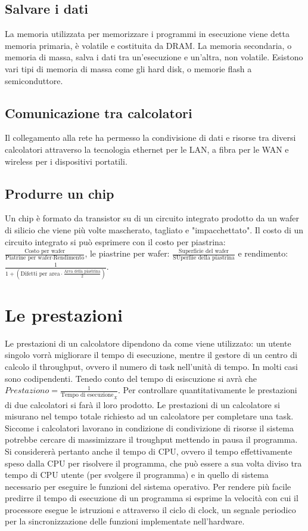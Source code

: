 \subsection{Salvare i dati}
La memoria utilizzata per memorizzare i programmi in esecuzione viene detta memoria primaria, \`e volatile e costituita da DRAM. La memoria secondaria, o memoria di massa, 
salva i dati tra un'esecuzione e un'altra, non volatile. Esistono vari tipi di memoria di massa come gli hard disk, o memorie flash a semiconduttore.
\subsection{Comunicazione tra calcolatori}
Il collegamento alla rete ha permesso la condivisione di dati e risorse tra diversi calcolatori attraverso la tecnologia ethernet per le LAN, a fibra per le WAN e wireless per 
i dispositivi portatili. 
\subsection{Produrre un chip}
Un chip \`e formato da transistor su di un circuito integrato prodotto da un wafer di silicio che viene pi\`u volte mascherato, tagliato e "impacchettato". Il costo di un
circuito integrato si pu\`o esprimere con il costo per piastrina: $\frac{\text{Costo per wafer}}{\text{Piatrine per wafer}\cdot\text{Rendimento}}$, le piastrine per wafer:
$\frac{\text{Superficie del wafer}}{\text{SUperfiie della piastrina}}$ e rendimento: $\frac{1}{1+(\text{Difetti per area}\cdot\frac{\text{Area della piastrina}}{2})}$.
\section{Le prestazioni}
Le prestazioni di un calcolatore dipendono da come viene utilizzato: un utente singolo vorr\`a migliorare il tempo di esecuzione, mentre il gestore di un centro di calcolo il
throughput, ovvero il numero di task nell'unit\`a di tempo. In molti casi sono codipendenti. Tenedo conto del tempo di esiscuzione si avr\`a che $Prestaziono=\frac{1}{
\text{Tempo di esecuzione}_X}$. Per controllare quantitativamente le prestazioni di due calcolatori si far\`a il loro prodotto. Le prestazioni di un calcolatore si misurano nel 
tempo totale richiesto ad un calcolatore per completare una task. Siccome i calcolatori lavorano in condizione di condivizione di risorse il sistema potrebbe cercare di 
massimizzare il troughput mettendo in pausa il programma. Si considerer\`a pertanto anche il tempo di CPU, ovvero il tempo effettivamente speso dalla CPU per risolvere il 
programma, che pu\`o essere a sua volta diviso tra tempo di CPU utente (per svolgere il programma) e in quello di sistema necessario per eseguire le funzioni del sistema 
operativo. Per rendere pi\`u facile predirre il tempo di esecuzione di un programma si esprime la velocit\`a con cui il processore esegue le istruzioni e attraverso il ciclo
di clock, un segnale periodico per la sincronizzazione delle funzioni implementate nell'hardware. 
